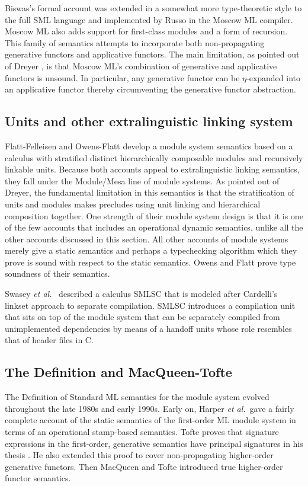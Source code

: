 \documentclass[12pt]{article}
\newcommand{\etal}{{\it et al.}}
\begin{document}
Biswas's formal account was extended in a somewhat more type-theoretic style to the full SML language and implemented by Russo in the Moscow ML compiler. Moscow ML also adds support for first-class modules\cite{russo00} and a form of recursion\cite{russo01}. This family of semantics attempts to incorporate both non-propagating generative functors and applicative functors. The main limitation, as pointed out of Dreyer \cite{dreyerthesis}, is that Moscow ML's combination of generative and applicative functors is unsound. In particular, any generative functor can be $\eta$-expanded into an applicative functor thereby circumventing the generative functor abstraction. 

\subsection{Units and other extralinguistic linking system}
Flatt-Felleisen \cite{ff98} and Owens-Flatt \cite{owensflatt06} develop a module system semantics based on a calculus with stratified distinct hierarchically composable modules and recursively linkable units. Because both accounts appeal to extralinguistic linking semantics, they fall under the Module/Mesa line of module systems. As pointed out of Dreyer\cite{mixml}, the fundamental limitation in this semantics is that the stratification of units and modules makes precludes using unit linking and hierarchical composition together. One strength of their module system design is that it is one of the few accounts that includes an operational dynamic semantics, unlike all the other accounts discussed in this section. All other accounts of module systems merely give a static semantics and perhaps a typechecking algorithm which they prove is sound with respect to the static semantics. Owens and Flatt prove type soundness of their semantics. 

Swasey \etal~\cite{swasey06} described a calculus SMLSC that is modeled after Cardelli's linkset approach to separate compilation. SMLSC introduces a compilation unit that sits on top of the module system that can be separately compiled from unimplemented dependencies by means of a handoff units whose role resembles that of header files in C.

\subsection{The Definition and MacQueen-Tofte}
The Definition of Standard ML \cite{mth90,mthm97} semantics for the module system evolved throughout the late 1980s and early 1990s. Early on, Harper \etal~gave a fairly complete account of the static semantics of the first-order ML module system in terms of an operational stamp-based semantics\cite{hmt:tapsoft87}. Tofte proves that signature expressions in the first-order, generative semantics have principal signatures in his thesis \cite{toftethesis}. He also extended this proof to cover non-propagating higher-order generative functors\cite{tofte:jfp94}. Then MacQueen and Tofte introduced true higher-order functor semantics\cite{mt94}. 
\end{document}
